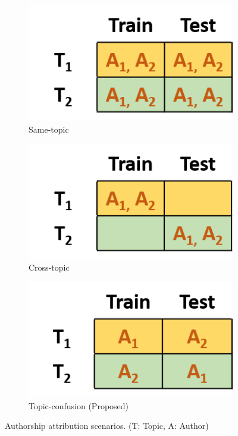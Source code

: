 \documentclass[11pt]{article}
\begin{document}
\begin{figure}[htb]
\centering
  \begin{subfigure}{0.33\textwidth}
  \centering
    \includegraphics[trim=20 5 0 0 ,clip,width=.75\linewidth]{images/Picture3}
    \caption{Same-topic\label{Fig:scenarios.a}}
  \end{subfigure}%
  \hfill 
  \begin{subfigure}{0.33\textwidth}
  \centering
    \includegraphics[trim=20 5 0 0 ,clip,width=.75\linewidth]{images/Picture1}
    \caption{Cross-topic\label{Fig:scenarios.b}}
  \end{subfigure}
  \hfill
  \begin{subfigure}{0.33\textwidth}
  \centering
    \includegraphics[trim=20 5 0 0 ,clip,width=0.75\linewidth]{images/Picture4}
    \caption{Topic-confusion (Proposed)\label{Fig:scenarios.c}}
  \end{subfigure}%
  \caption{Authorship attribution scenarios. (T: Topic, A: Author)\label{Fig:scenarios}}
\end{figure}
\end{document}
